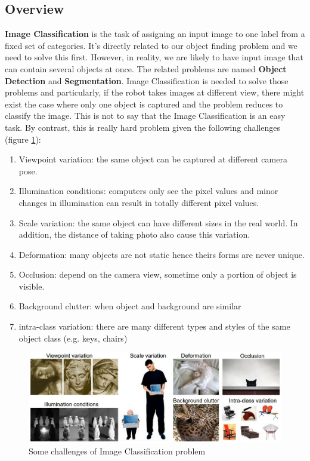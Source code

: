 \subsection{Overview}
\textbf{Image Classification} is the task of assigning an input image to one label from a fixed set of categories. It's directly related to our object finding problem and we need to solve this first. However, in reality, we are likely to have input image that can contain several objects at once. The related problems are named \textbf{Object Detection} and \textbf{Segmentation}. Image Classification is needed to solve those problems and particularly, if the robot takes images at different view, there might exist the case where only one object is captured and the problem reduces to classify the image. This is not to say that the Image Classification is an easy task. By contrast, this is really hard problem given the following challenges (figure \ref{fig:ImClasschallenges}):
\begin{enumerate}
	\item Viewpoint variation: the same object can be captured at different camera pose.
	\item Illumination conditions: computers only see the pixel values and minor changes in illumination can result in totally different pixel values. 
	\item Scale variation: the same object can have different sizes in the real world. In addition, the distance of taking photo also cause this variation.
	\item Deformation: many objects are not static hence theirs forms are never unique.
	\item Occlusion: depend on the camera view, sometime only a portion of object is visible.
	\item Background clutter: when object and background are similar
	\item intra-class variation: there are many different types and styles of the same object class (e.g. keys, chairs)
\end{enumerate}

\begin{figure}[tb]
\centering
\includegraphics[width =0.9\hsize]{./figures/ImClasschallenges}
\caption{Some challenges of Image Classification problem}
\label{fig:ImClasschallenges}
\end{figure}
